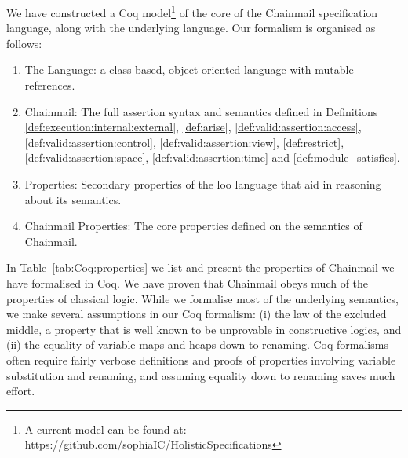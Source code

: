 We have constructed a Coq model\footnote{A current model can be found at: https://github.com/sophiaIC/HolisticSpecifications} \cite{coq} of the core of the Chainmail
specification language, along with the underlying \LangOO language.
Our formalism is organised as follows:
\begin{enumerate}
\item
The \LangOO Language: a class based, object oriented language with mutable references.
\item
Chainmail: The full assertion syntax and semantics defined in Definitions \ref{def:execution:internal:external}, \ref{def:arise}, \ref{def:valid:assertion:access}, \ref{def:valid:assertion:control}, \ref{def:valid:assertion:view}, \ref{def:restrict}, \ref{def:valid:assertion:space}, %
\ref{def:valid:assertion:time} and \ref{def:module_satisfies}.
\item
\LangOO Properties: Secondary properties of the loo language that aid in reasoning about its semantics.
\item
Chainmail Properties: The core properties defined on the semantics of Chainmail.
\end{enumerate}

In Table~\ref{tab:Coq:properties} we list and present the properties of Chainmail we have formalised in Coq.
We have proven that Chainmail obeys much of the properties of classical logic. While we formalise most of the underlying semantics, we make several assumptions in our Coq formalism: (i) the law of the excluded middle,  a property that is well known to be unprovable in constructive logics, and (ii) the equality of variable maps and heaps down to renaming. Coq formalisms often require fairly verbose definitions and proofs of properties involving variable substitution and renaming, and assuming equality down to renaming saves much effort.


